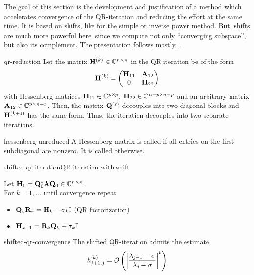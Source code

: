 \begin{intro}
  The goal of this section is the development and justification of a
  method which accelerates convergence of the QR-iteration and
  reducing the effort at the same time. It is based on shifts, like
  for the simple or inverse power method. But, shifts are much more
  powerful here, since we compute not only ``converging subspace'',
  but also its complement. The presentation follows
  mostly~\cite{GolubVanLoan83}.
\end{intro}

\begin{Theorem}{qr-reduction}
  Let the matrix $\matH^{(k)}\in\Cnn$ in the QR iteration be of the
  form
  \begin{gather}
    \matH^{(k)} =
    \begin{pmatrix}
      \matH_{11} & \mata_{12}\\0 & \matH_{22}
    \end{pmatrix}
  \end{gather}
  with Hessenberg matrices $\matH_{11}\in\C^{p\times p}$,
  $\matH_{22}\in \C^{n-p\times n-p}$ and an arbitrary matrix
  $\mata_{12}\in \C^{p\times n-p}$. Then, the matrix $\matq^{(k)}$
  decouples into two diagonal blocks and $\matH^{(k+1)}$ has the same
  form. Thus, the iteration decouples into two separate iterations.
\end{Theorem}

\begin{Definition}{hessenberg-unreduced}
  A Hessenberg matrix is called  if all entries on
  the first subdiagonal are nonzero. It is called 
  otherwise.
\end{Definition}

\begin{Algorithm*}{shifted-qr-iteration}{QR iteration with shift}
  
  Let $\matH_1 = \matq_0^*\mata\matq_0\in\Cnn$.\\
  For $k=1,\ldots$ until convergence repeat
  \begin{itemize}
  \item $\matq_k\matr_k = \matH_k - \sigma_k\id$ (QR factorization)
  \item $\matH_{k+1} = \matr_k\matq_k + \sigma_k\id$
  \end{itemize}
\end{Algorithm*}

\begin{Lemma}{shifted-qr-convergence}
  The shifted QR-iteration admits the estimate
  \begin{gather}
    h_{j+1,j}^{(k)} = \bigo \left(\abs*{\frac{\lambda_{j+1}-\sigma}{\lambda_j-\sigma}}^k\right)
  \end{gather}
\end{Lemma}


